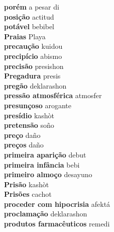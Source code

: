 \textbf{ porém  } a pesar di \\
\textbf{ posição  } actitud \\
\textbf{ potável  } bebibel \\
\textbf{ Praias  } Playa \\
\textbf{ precaução  } kuidou \\
\textbf{ precipício  } abismo \\
\textbf{ precisão  } presishon \\
\textbf{ Pregadura  } presis \\
\textbf{ pregão  } deklarashon \\
\textbf{ pressão atmosférica  } atmosfer \\
\textbf{ presunçoso  } arogante \\
\textbf{ presídio  } kashòt \\
\textbf{ pretensão  } soño \\
\textbf{ preço  } daño \\
\textbf{ preços  } daño \\
\textbf{ primeira aparição  } debut \\
\textbf{ primeira infância  } bebi \\
\textbf{ primeiro almoço  } desayuno \\
\textbf{ Prisão  } kashòt \\
\textbf{ Prisões  } cachot \\
\textbf{ proceder com hipocrisia  } afektá \\
\textbf{ proclamação  } deklarashon \\
\textbf{ produtos farmacêuticos  } remedi \\

